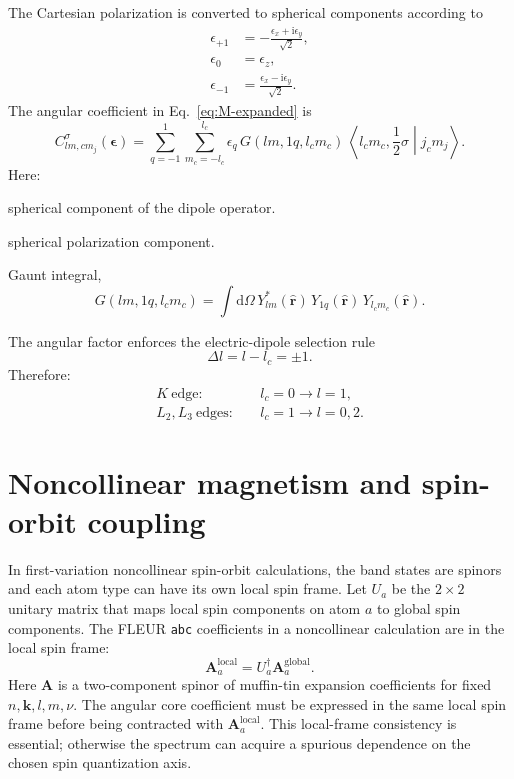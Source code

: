 \documentclass[11pt,a4paper]{article}
\newcommand{\ii}{\mathrm{i}}
\newcommand{\dd}{\mathrm{d}}
\newcommand{\kvec}{\mathbf{k}}
\newcommand{\rvec}{\mathbf{r}}
\newcommand{\epsvec}{\boldsymbol{\epsilon}}
\newcommand{\absr}{a}
\newcommand{\sig}{\sigma}
\begin{document}
The Cartesian polarization is converted to spherical components according to
\begin{align}
  \epsilon_{+1} &= -\frac{\epsilon_x+\ii\epsilon_y}{\sqrt{2}},\\
  \epsilon_{0}  &= \epsilon_z,\\
  \epsilon_{-1}&= \frac{\epsilon_x-\ii\epsilon_y}{\sqrt{2}} .
\end{align}
The angular coefficient in Eq.~\eqref{eq:M-expanded} is
\begin{equation}
\label{eq:angular-coefficient}
  C^{\sig}_{lm,c m_j}(\epsvec)
  =
  \sum_{q=-1}^{1}
  \sum_{m_c=-l_c}^{l_c}
  \epsilon_q\,
  G(lm,1q,l_c m_c)\,
  \left\langle
    l_c m_c,\frac12 \sig
  \middle|
    j_c m_j
  \right\rangle .
\end{equation}
Here:
\begin{description}[leftmargin=2.7cm,style=nextline]
  \item[\(q=-1,0,+1\)] spherical component of the dipole operator.
  \item[\(\epsilon_q\)] spherical polarization component.
  \item[\(G(lm,1q,l_c m_c)\)] Gaunt integral,
  \begin{equation}
    G(lm,1q,l_c m_c)
    =
    \int \dd\Omega\,
    Y^*_{lm}(\hat{\rvec})\,
    Y_{1q}(\hat{\rvec})\,
    Y_{l_c m_c}(\hat{\rvec}) .
  \end{equation}
\end{description}
The angular factor enforces the electric-dipole selection rule
\begin{equation}
  \Delta l = l-l_c = \pm 1 .
\end{equation}
Therefore:
\begin{align}
  K\ \mathrm{edge}:  \quad & l_c=0 \rightarrow l=1,\\
  L_2,L_3\ \mathrm{edges}: \quad & l_c=1 \rightarrow l=0,2 .
\end{align}

\section{Noncollinear magnetism and spin-orbit coupling}

In first-variation noncollinear spin-orbit calculations, the band states are
spinors and each atom type can have its own local spin frame. Let
\(U_{\absr}\) be the \(2\times 2\) unitary matrix that maps local spin
components on atom \(\absr\) to global spin components. The FLEUR
\texttt{abc} coefficients in a noncollinear calculation are in the local spin
frame:
\begin{equation}
\label{eq:local-spin}
  \mathbf{A}^{\mathrm{local}}_{\absr}
  =
  U_{\absr}^{\dagger}
  \mathbf{A}^{\mathrm{global}}_{\absr}.
\end{equation}
Here \(\mathbf{A}\) is a two-component spinor of muffin-tin expansion
coefficients for fixed \(n,\kvec,l,m,\nu\). The angular core coefficient must be
expressed in the same local spin frame before being contracted with
\(\mathbf{A}^{\mathrm{local}}_{\absr}\). This local-frame consistency is
essential; otherwise the spectrum can acquire a spurious dependence on the
chosen spin quantization axis.
\end{document}
